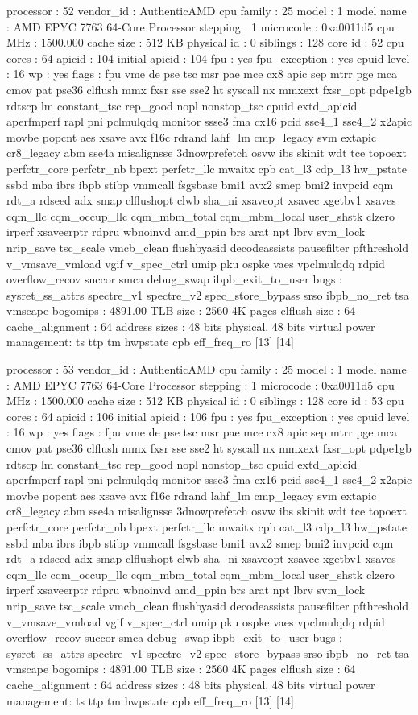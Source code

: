 processor	: 52
vendor_id	: AuthenticAMD
cpu family	: 25
model		: 1
model name	: AMD EPYC 7763 64-Core Processor
stepping	: 1
microcode	: 0xa0011d5
cpu MHz		: 1500.000
cache size	: 512 KB
physical id	: 0
siblings	: 128
core id		: 52
cpu cores	: 64
apicid		: 104
initial apicid	: 104
fpu		: yes
fpu_exception	: yes
cpuid level	: 16
wp		: yes
flags		: fpu vme de pse tsc msr pae mce cx8 apic sep mtrr pge mca cmov pat pse36 clflush mmx fxsr sse sse2 ht syscall nx mmxext fxsr_opt pdpe1gb rdtscp lm constant_tsc rep_good nopl nonstop_tsc cpuid extd_apicid aperfmperf rapl pni pclmulqdq monitor ssse3 fma cx16 pcid sse4_1 sse4_2 x2apic movbe popcnt aes xsave avx f16c rdrand lahf_lm cmp_legacy svm extapic cr8_legacy abm sse4a misalignsse 3dnowprefetch osvw ibs skinit wdt tce topoext perfctr_core perfctr_nb bpext perfctr_llc mwaitx cpb cat_l3 cdp_l3 hw_pstate ssbd mba ibrs ibpb stibp vmmcall fsgsbase bmi1 avx2 smep bmi2 invpcid cqm rdt_a rdseed adx smap clflushopt clwb sha_ni xsaveopt xsavec xgetbv1 xsaves cqm_llc cqm_occup_llc cqm_mbm_total cqm_mbm_local user_shstk clzero irperf xsaveerptr rdpru wbnoinvd amd_ppin brs arat npt lbrv svm_lock nrip_save tsc_scale vmcb_clean flushbyasid decodeassists pausefilter pfthreshold v_vmsave_vmload vgif v_spec_ctrl umip pku ospke vaes vpclmulqdq rdpid overflow_recov succor smca debug_swap ibpb_exit_to_user
bugs		: sysret_ss_attrs spectre_v1 spectre_v2 spec_store_bypass srso ibpb_no_ret tsa vmscape
bogomips	: 4891.00
TLB size	: 2560 4K pages
clflush size	: 64
cache_alignment	: 64
address sizes	: 48 bits physical, 48 bits virtual
power management: ts ttp tm hwpstate cpb eff_freq_ro [13] [14]

processor	: 53
vendor_id	: AuthenticAMD
cpu family	: 25
model		: 1
model name	: AMD EPYC 7763 64-Core Processor
stepping	: 1
microcode	: 0xa0011d5
cpu MHz		: 1500.000
cache size	: 512 KB
physical id	: 0
siblings	: 128
core id		: 53
cpu cores	: 64
apicid		: 106
initial apicid	: 106
fpu		: yes
fpu_exception	: yes
cpuid level	: 16
wp		: yes
flags		: fpu vme de pse tsc msr pae mce cx8 apic sep mtrr pge mca cmov pat pse36 clflush mmx fxsr sse sse2 ht syscall nx mmxext fxsr_opt pdpe1gb rdtscp lm constant_tsc rep_good nopl nonstop_tsc cpuid extd_apicid aperfmperf rapl pni pclmulqdq monitor ssse3 fma cx16 pcid sse4_1 sse4_2 x2apic movbe popcnt aes xsave avx f16c rdrand lahf_lm cmp_legacy svm extapic cr8_legacy abm sse4a misalignsse 3dnowprefetch osvw ibs skinit wdt tce topoext perfctr_core perfctr_nb bpext perfctr_llc mwaitx cpb cat_l3 cdp_l3 hw_pstate ssbd mba ibrs ibpb stibp vmmcall fsgsbase bmi1 avx2 smep bmi2 invpcid cqm rdt_a rdseed adx smap clflushopt clwb sha_ni xsaveopt xsavec xgetbv1 xsaves cqm_llc cqm_occup_llc cqm_mbm_total cqm_mbm_local user_shstk clzero irperf xsaveerptr rdpru wbnoinvd amd_ppin brs arat npt lbrv svm_lock nrip_save tsc_scale vmcb_clean flushbyasid decodeassists pausefilter pfthreshold v_vmsave_vmload vgif v_spec_ctrl umip pku ospke vaes vpclmulqdq rdpid overflow_recov succor smca debug_swap ibpb_exit_to_user
bugs		: sysret_ss_attrs spectre_v1 spectre_v2 spec_store_bypass srso ibpb_no_ret tsa vmscape
bogomips	: 4891.00
TLB size	: 2560 4K pages
clflush size	: 64
cache_alignment	: 64
address sizes	: 48 bits physical, 48 bits virtual
power management: ts ttp tm hwpstate cpb eff_freq_ro [13] [14]

